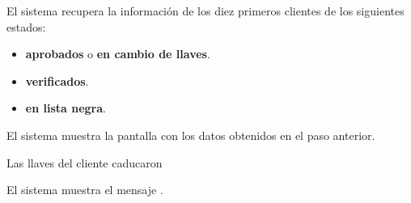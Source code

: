 {\begin{trayectoriaAlternativa}[ta:administrador]
    \item El sistema recupera la información de los diez primeros clientes
      de los siguientes estados:
      \begin{itemize}
        \item \textbf{aprobados} o \textbf{en cambio de llaves}.
        \item \textbf{verificados}.
        \item \textbf{en lista negra}.
      \end{itemize}

    \item El sistema muestra la pantalla
       con los datos obtenidos en el paso
      anterior.

  \end{trayectoriaAlternativa}


  \begin{trayectoriaAlternativa}[ta:criptoperiodo]
    {Las llaves del cliente caducaron}

    \item El sistema muestra el mensaje
      .

  \end{trayectoriaAlternativa}
}
